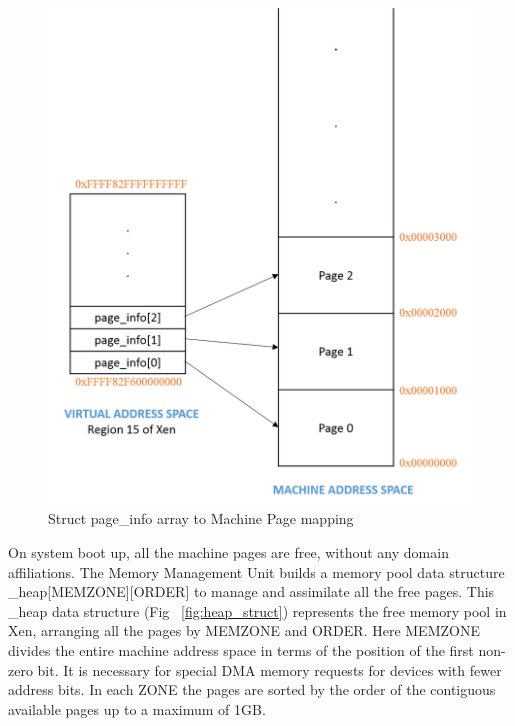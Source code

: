 \begin{figure}[h]
\centering
\includegraphics[scale=0.8]{figures/page_info.png}
\caption{Struct page\_info array to Machine Page mapping}
\label{fig:page_info_mapping}
\end{figure}

On system boot up, all the machine pages are free, without any domain affiliations. The Memory Management Unit builds a memory pool data structure \_heap[MEMZONE][ORDER] to manage and assimilate all the free pages. This \_heap data structure (Fig ~\ref{fig:heap_struct}) represents the free memory pool in Xen, arranging all the pages by MEMZONE and ORDER. Here MEMZONE divides the entire machine address space in terms of the position of the first non-zero bit. It is necessary for special DMA memory requests for devices with fewer address bits. In each ZONE the pages are sorted by the order of the contiguous available pages up to a maximum of 1GB. 


